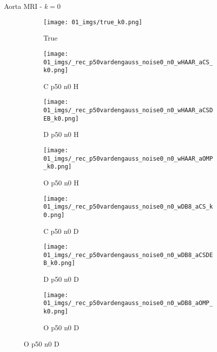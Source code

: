 \begin{frame}{Aorta MRI - $k=0$}{}
\begin{figure}
\begin{subfigure}{0.13\textwidth}
\texttt{[image: 01\_imgs/true\_k0.png]}
\caption*{\tiny True}
\end{subfigure}
\begin{subfigure}{0.13\textwidth}
\texttt{[image: 01\_imgs/\_rec\_p50vardengauss\_noise0\_n0\_wHAAR\_aCS\_k0.png]}
\caption*{\tiny C p50 n0 H}
\end{subfigure}
\begin{subfigure}{0.13\textwidth}
\texttt{[image: 01\_imgs/\_rec\_p50vardengauss\_noise0\_n0\_wHAAR\_aCSDEB\_k0.png]}
\caption*{\tiny D p50 n0 H}
\end{subfigure}
\begin{subfigure}{0.13\textwidth}
\texttt{[image: 01\_imgs/\_rec\_p50vardengauss\_noise0\_n0\_wHAAR\_aOMP\_k0.png]}
\caption*{\tiny O p50 n0 H}
\end{subfigure}
\begin{subfigure}{0.13\textwidth}
\texttt{[image: 01\_imgs/\_rec\_p50vardengauss\_noise0\_n0\_wDB8\_aCS\_k0.png]}
\caption*{\tiny C p50 n0 D}
\end{subfigure}
\begin{subfigure}{0.13\textwidth}
\texttt{[image: 01\_imgs/\_rec\_p50vardengauss\_noise0\_n0\_wDB8\_aCSDEB\_k0.png]}
\caption*{\tiny D p50 n0 D}
\end{subfigure}
\begin{subfigure}{0.13\textwidth}
\texttt{[image: 01\_imgs/\_rec\_p50vardengauss\_noise0\_n0\_wDB8\_aOMP\_k0.png]}
\caption*{\tiny O p50 n0 D}
\end{subfigure}

\vspace{5pt}


\end{figure}
\end{frame}
